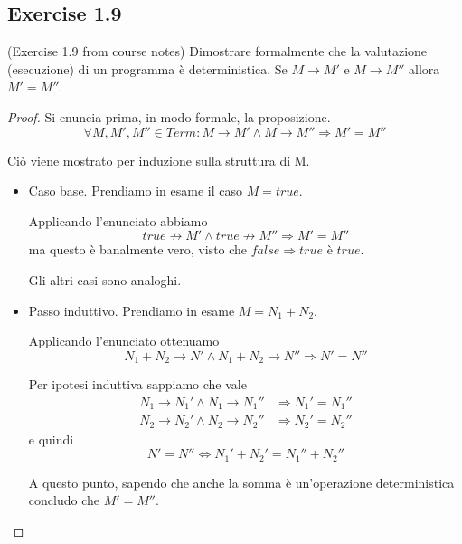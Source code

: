 \documentclass[12pt,a4paper,oneside]{book}
\begin{document}
\subsection{Exercise 1.9}

\begin{exercise}{(Exercise 1.9 from course notes)}
    Dimostrare formalmente che la valutazione (esecuzione) di un
    programma è deterministica. Se $M \to M'$ e $M \to M''$ allora $M'
    = M''$.

    \begin{proof}
        Si enuncia prima, in modo formale, la proposizione.
        \[
        \forall M, M', M'' \in Term: M \to M' \land M \to M'' \Rightarrow M' = M''
        \]
        
       	Ciò viene mostrato per induzione sulla struttura di M.
       	
       	\begin{itemize}
       		\item Caso base. Prendiamo in esame il caso $M = true$.
       		
       		Applicando l'enunciato abbiamo
       		\[
       		true \not\to M' \land true \not\to M'' \Rightarrow M' = M''
       		\]
       		ma questo è banalmente vero, visto che $false \Rightarrow
       		true$ è $true$.
       		
       		Gli altri casi sono analoghi.
       		
       		\item Passo induttivo. Prendiamo in esame $M = N_1 + N_2$.
       		
       		Applicando l'enunciato ottenuamo
       		\[
       		N_1 + N_2 \to N' \land N_1 + N_2 \to N'' \Rightarrow N' = N''
       		\]
       		
       		Per ipotesi induttiva sappiamo che vale
       		\begin{equation*}
       		\begin{split}
       		N_1 \to N_1' \land N_1 \to N_1'' & \Rightarrow N_1' = N_1'' \\
       		N_2 \to N_2' \land N_2 \to N_2'' & \Rightarrow N_2' = N_2''
       		\end{split}
       		\end{equation*}
       		e quindi
       		\[
       		N' = N'' \Leftrightarrow N_1' + N_2' = N_1'' + N_2''
       		\]
       		
       		A questo punto, sapendo che anche la somma è un'operazione
       		deterministica concludo che $M' = M''$.
       	\end{itemize}
    \end{proof}
\end{exercise}
\end{document}
